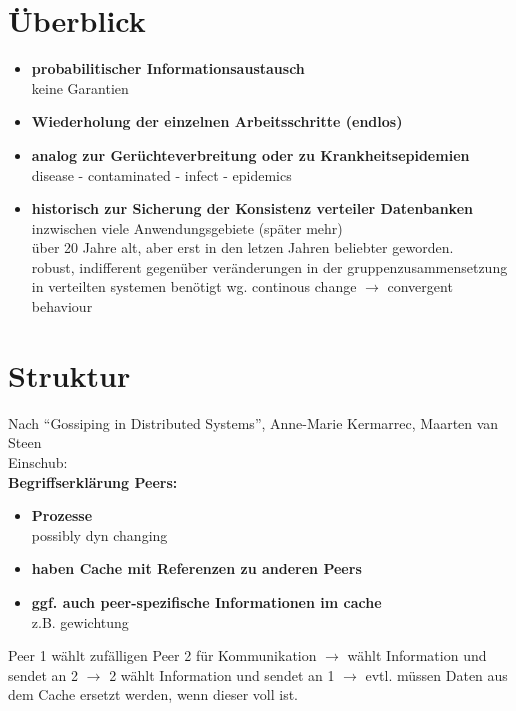 \documentclass[10pt]{report}
\begin{document}
\section{Überblick}
\begin{itemize}
	\item \textbf{probabilitischer Informationsaustausch\\}
	keine Garantien
\item \textbf{Wiederholung der einzelnen Arbeitsschritte (endlos)\\}


\item \textbf{analog zur Gerüchteverbreitung oder zu Krankheitsepidemien\\}
	disease - contaminated - infect - epidemics
\item \textbf{historisch zur Sicherung der Konsistenz verteiler Datenbanken\\}
	inzwischen viele Anwendungsgebiete (später mehr)\\
	über 20 Jahre alt, aber erst in den letzen Jahren beliebter geworden.\\
	robust, indifferent gegenüber veränderungen in der gruppenzusammensetzung
 	in verteilten systemen benötigt	wg. continous change $\rightarrow$ convergent behaviour\\
\end{itemize}
\section{Struktur}
Nach ``Gossiping in Distributed Systems'', Anne-Marie Kermarrec, Maarten van Steen\\
Einschub:\\
\textbf{Begriffserklärung Peers:}\\
\begin{itemize}
	\item \textbf{Prozesse\\}
		possibly dyn changing
	\item \textbf{haben Cache  mit Referenzen zu anderen Peers}
	\item \textbf{ggf. auch peer-spezifische Informationen im cache\\}
		z.B. gewichtung\\

\end{itemize}
Peer 1 wählt zufälligen Peer 2 für Kommunikation $\rightarrow$ wählt Information und sendet an 2 $\rightarrow$ 2 wählt Information und sendet an 1 $\rightarrow$ evtl. müssen Daten aus dem Cache ersetzt werden, wenn dieser voll ist.
\end{document}
